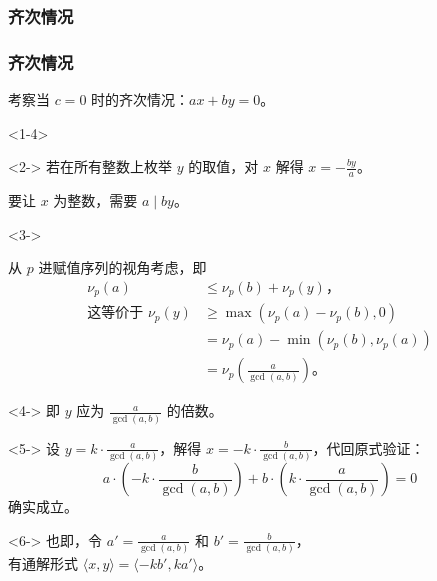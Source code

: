 \documentclass{../pkslide}
\begin{document}

\subsubsection{齐次情况}


\begin{frame}
  \frametitle{齐次情况}
  考察当 $c = 0$ 时的齐次情况：$a x + b y = 0$。
  
  \begin{onlyenv}<1-4>
    \begin{uncoverenv}<2->
      若在所有整数上枚举 $y$ 的取值，对 $x$ 解得 $x = -\frac{b y}{a}$。
      
      要让 $x$ 为整数，需要 $a \mid b y$。
    \end{uncoverenv}
    
    \begin{uncoverenv}<3->
      \emptyline
      
      从 $p$ 进赋值序列的视角考虑，即%
      \begin{align*}
        \nu_p(a) & \le \nu_p(b) + \nu_p(y)\text{，} \\
        \text{这等价于\ } \nu_p(y) & \ge \max(\nu_p(a) - \nu_p(b), 0) \\
        & = \nu_p(a) - \min(\nu_p(b), \nu_p(a)) \\
        & = \nu_p \!\left( \tfrac{a}{\gcd(a, b)} \right)\! \text{。}
      \end{align*}%
    \end{uncoverenv}%
    \begin{uncoverenv}<4->
      即 $y$ 应为 $\frac{a}{\gcd(a, b)}$ 的倍数。
    \end{uncoverenv}
  \end{onlyenv}
  
  \begin{onlyenv}<5->
    设 $y = k \cdot \frac{a}{\gcd(a, b)}$，解得 $x = -k \cdot \frac{b}{\gcd(a, b)}$，代回原式验证：%
    \[
      a \cdot \!\left( -k \cdot \frac{b}{\gcd(a, b)} \right)\! + b \cdot \!\left( k \cdot \frac{a}{\gcd(a, b)} \right) = 0
    \]%
    确实成立。
    
    \emptyline
    
    \begin{uncoverenv}<6->
      也即，令 $a' = \frac{a}{\gcd(a, b)}$ 和 $b' = \frac{b}{\gcd(a, b)}$，\\
      \-\hspace{3em}有通解形式 $\langle x, y \rangle = \langle -k b', k a' \rangle$。
    \end{uncoverenv}
  \end{onlyenv}
\end{frame}
\end{document}

